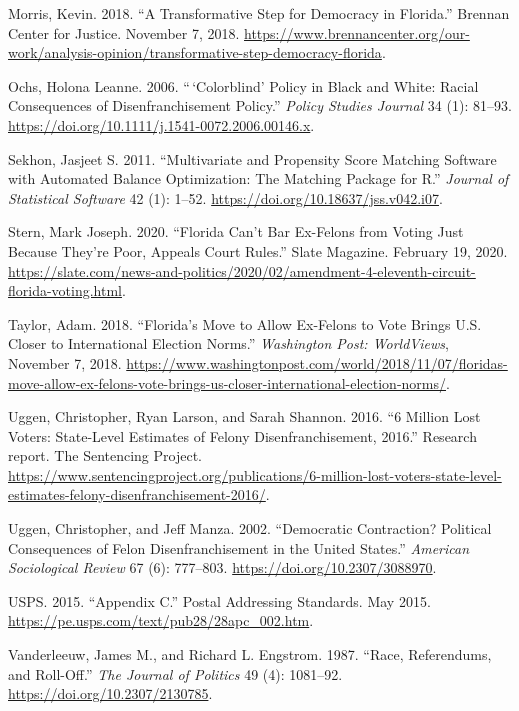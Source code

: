 \documentclass[
  12pt,
]{article}
\newlength{\cslhangindent}
\newenvironment{cslreferences}%
  {\setlength{\parindent}{0pt}%
  \everypar{\setlength{\hangindent}{\cslhangindent}}\ignorespaces}%
  {\par}
\begin{document}
\begin{cslreferences}
\leavevmode\hypertarget{ref-Morris2018}{}%
Morris, Kevin. 2018. ``A Transformative Step for Democracy in Florida.'' Brennan Center for Justice. November 7, 2018. \url{https://www.brennancenter.org/our-work/analysis-opinion/transformative-step-democracy-florida}.

\leavevmode\hypertarget{ref-Ochs2006}{}%
Ochs, Holona Leanne. 2006. ``\,`Colorblind' Policy in Black and White: Racial Consequences of Disenfranchisement Policy.'' \emph{Policy Studies Journal} 34 (1): 81--93. \url{https://doi.org/10.1111/j.1541-0072.2006.00146.x}.

\leavevmode\hypertarget{ref-Sekhon2011}{}%
Sekhon, Jasjeet S. 2011. ``Multivariate and Propensity Score Matching Software with Automated Balance Optimization: The Matching Package for R.'' \emph{Journal of Statistical Software} 42 (1): 1--52. \url{https://doi.org/10.18637/jss.v042.i07}.

\leavevmode\hypertarget{ref-Stern2020}{}%
Stern, Mark Joseph. 2020. ``Florida Can't Bar Ex-Felons from Voting Just Because They're Poor, Appeals Court Rules.'' Slate Magazine. February 19, 2020. \url{https://slate.com/news-and-politics/2020/02/amendment-4-eleventh-circuit-florida-voting.html}.

\leavevmode\hypertarget{ref-Taylor2018}{}%
Taylor, Adam. 2018. ``Florida's Move to Allow Ex-Felons to Vote Brings U.S. Closer to International Election Norms.'' \emph{Washington Post: WorldViews}, November 7, 2018. \url{https://www.washingtonpost.com/world/2018/11/07/floridas-move-allow-ex-felons-vote-brings-us-closer-international-election-norms/}.

\leavevmode\hypertarget{ref-sentencing_2016}{}%
Uggen, Christopher, Ryan Larson, and Sarah Shannon. 2016. ``6 Million Lost Voters: State-Level Estimates of Felony Disenfranchisement, 2016.'' Research report. The Sentencing Project. \url{https://www.sentencingproject.org/publications/6-million-lost-voters-state-level-estimates-felony-disenfranchisement-2016/}.

\leavevmode\hypertarget{ref-Uggen2002}{}%
Uggen, Christopher, and Jeff Manza. 2002. ``Democratic Contraction? Political Consequences of Felon Disenfranchisement in the United States.'' \emph{American Sociological Review} 67 (6): 777--803. \url{https://doi.org/10.2307/3088970}.

\leavevmode\hypertarget{ref-USPS2015}{}%
USPS. 2015. ``Appendix C.'' Postal Addressing Standards. May 2015. \url{https://pe.usps.com/text/pub28/28apc_002.htm}.

\leavevmode\hypertarget{ref-Vanderleeuw1987}{}%
Vanderleeuw, James M., and Richard L. Engstrom. 1987. ``Race, Referendums, and Roll-Off.'' \emph{The Journal of Politics} 49 (4): 1081--92. \url{https://doi.org/10.2307/2130785}.


\end{cslreferences}
\end{document}
